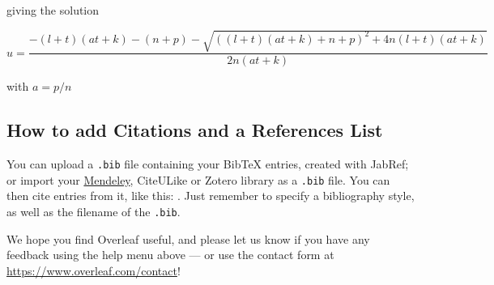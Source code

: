 \documentclass[a4paper]{article}
\begin{document}
giving the solution


\begin{equation}
    u = \frac{-(l+t)(at+k)-(n+p)-\sqrt{((l+t)(at+k)+n+p)^2+4n(l+t)(at+k)}}{2n(at+k)}
\end{equation}

with $a=p/n$



\subsection{How to add Citations and a References List}

You can upload a \verb|.bib| file containing your BibTeX entries, created with JabRef; or import your \href{https://www.overleaf.com/blog/184}{Mendeley}, CiteULike or Zotero library as a \verb|.bib| file. You can then cite entries from it, like this: \cite{greenwade93}. Just remember to specify a bibliography style, as well as the filename of the \verb|.bib|.


We hope you find Overleaf useful, and please let us know if you have any feedback using the help menu above --- or use the contact form at \url{https://www.overleaf.com/contact}!



\end{document}
